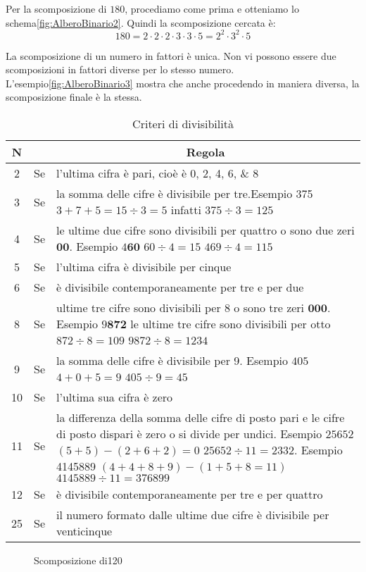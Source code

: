 Per la scomposizione di $180$, procediamo come prima e otteniamo lo schema\nobs\vref{fig:AlberoBinario2}. Quindi la scomposizione cercata è:
\[180=2\cdot 2\cdot 2\cdot 3\cdot 3\cdot 5=2^2\cdot 3^2\cdot 5 \]    

La scomposizione di un numero in fattori è unica. Non vi possono essere due scomposizioni in fattori diverse per lo stesso numero. L'esempio\nobs\vref{fig:AlberoBinario3} mostra che anche procedendo in maniera diversa, la scomposizione finale è la stessa.
\begin{table}
\centering
\begin{tabular}{ccp{}}
\toprule  N&  &\multicolumn{1}{c}{Regola}   \\ 
\midrule 2 & Se & l'ultima cifra è pari, cioè è  \numlist{0;2;4;6;8} \\ 
3 & Se & la somma delle cifre è divisibile per tre.Esempio \num{375} $3+7+5=15\div3=5$ infatti $375\div 3=125$ \\ 
 4 & Se & le ultime due cifre sono divisibili per quattro o sono due zeri $\mathbf{00}$. Esempio $4\mathbf{60}$ $60\div 4=15$ $469\div 4=115$ \\
 5 & Se & l'ultima cifra è divisibile per cinque \\  
 6 & Se & è divisibile contemporaneamente per tre e per due  \\  
 8 & Se & ultime tre cifre sono divisibili per 8 o sono tre zeri $\mathbf{000}$. Esempio $9\mathbf{872}$ le ultime tre cifre sono divisibili per otto $872\div 8= 109$ $9872\div 8=1234$ \\  
 9 & Se & la somma delle cifre è divisibile per 9. Esempio $405$ $4+0+5=9$ $405\div9=45$  \\
 10 & Se & l'ultima sua cifra è zero \\
 11 & Se& la differenza della somma delle cifre di posto pari e le cifre di posto dispari è zero o si divide per undici. Esempio $25652$ $(5+5)-(2+6+2)=0$ $25652\div 11=2332$. Esempio \num{4145889} $(4+4+8+9)-(1+5+8=11)$ $4145889\div 11=376899$  \\    
 12 & Se & è divisibile contemporaneamente per tre e per quattro  \\  
 25 & Se & il numero  formato dalle ultime due cifre è divisibile per venticinque\\
\bottomrule
\end{tabular}
\caption{Criteri di divisibilità}
\label{tab:criteriDivisitilità}
\end{table} 
\begin{figure}
		\centering

	\caption[]{Scomposizione di\num{120}}
	\label{fig:AlberoBinario1}
\end{figure}
